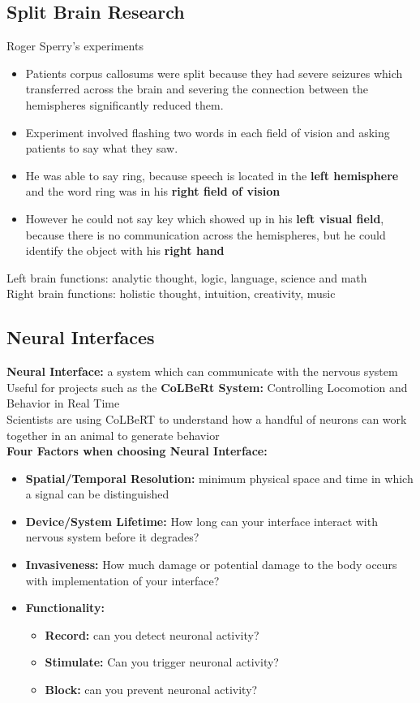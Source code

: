\documentclass{article}
\begin{document}
\subsection{Split Brain Research}
Roger Sperry's experiments
\begin{itemize}
    \item Patients corpus callosums were split because they had severe seizures which transferred across the brain and severing the connection between the hemispheres significantly reduced them. 
    \item Experiment involved flashing two words in each field of vision and asking patients to say what they saw. 
    \item He was able to say ring, because speech is located in the \textbf{left hemisphere} and the word ring was in his \textbf{right field of vision}
    \item However he could not say key which showed up in his \textbf{left visual field}, because there is no communication across the hemispheres, but he could identify the object with his \textbf{right hand}
\end{itemize}
 Left brain functions: analytic thought, logic, language, science and math\\
 Right brain functions: holistic thought, intuition, creativity, music

\subsection{Neural Interfaces}
\textbf{Neural Interface:} a system which can communicate with the nervous system \\

\noindent Useful for projects such as the \textbf{CoLBeRt System:} Controlling Locomotion and Behavior in Real Time \\
Scientists are using CoLBeRT to understand how a handful of neurons can work together in an animal to generate behavior \\

\noindent\textbf{Four Factors when choosing Neural Interface:}
\begin{itemize}
    \item \textbf{Spatial/Temporal Resolution:} minimum physical space and time in which a signal can be distinguished
    \item \textbf{Device/System Lifetime:} How long can your interface interact with nervous system before it degrades?
    \item \textbf{Invasiveness:} How much damage or potential damage to the body occurs with implementation of your interface?
    \item \textbf{Functionality:} 
    \begin{itemize}
        \item \textbf{Record:} can you detect neuronal activity?
        \item \textbf{Stimulate:} Can you trigger neuronal activity?
        \item \textbf{Block:} can you prevent neuronal activity?
    \end{itemize}
\end{itemize}
\end{document}
